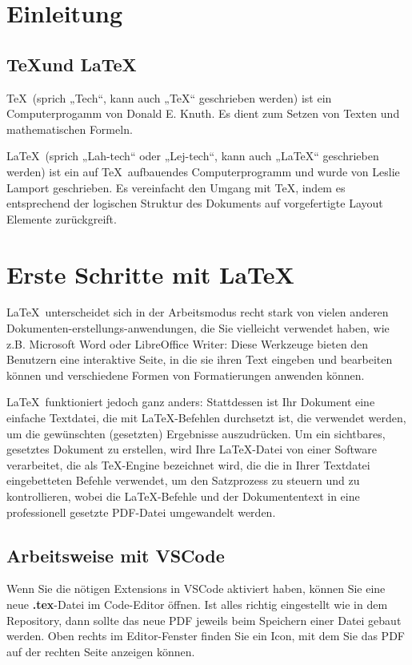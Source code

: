 \section{Einleitung}
\subsection{\TeX und \LaTeX}

\TeX\, (sprich „Tech“, kann auch „TeX“ geschrieben werden) ist ein Computerprogamm von Donald E. Knuth.
Es dient zum Setzen von Texten und mathematischen Formeln.
\vspace{2mm}


\LaTeX\, (sprich „Lah-tech“ oder „Lej-tech“, kann auch „LaTeX“ geschrieben werden) ist ein auf \TeX\, aufbauendes Computerprogramm und wurde von Leslie Lamport geschrieben. Es vereinfacht den Umgang mit  \TeX, indem es entsprechend der logischen Struktur des Dokuments auf vorgefertigte Layout Elemente zurückgreift.

\newpage
\section{Erste Schritte mit \LaTeX}
\LaTeX\, unterscheidet sich in der Arbeitsmodus recht stark von vielen anderen Dokumenten-erstellungs-anwendungen, die Sie vielleicht verwendet haben, wie z.B. Microsoft Word oder LibreOffice Writer: Diese Werkzeuge bieten den Benutzern eine interaktive Seite, in die sie ihren Text eingeben und bearbeiten können und verschiedene Formen von Formatierungen anwenden können.

\LaTeX\, funktioniert jedoch ganz anders: Stattdessen ist Ihr Dokument eine einfache Textdatei, die mit \LaTeX-Befehlen durchsetzt ist, die verwendet werden, um die gewünschten (gesetzten) Ergebnisse auszudrücken. Um ein sichtbares, gesetztes Dokument zu erstellen, wird Ihre \LaTeX-Datei von einer Software verarbeitet, die als \TeX-Engine bezeichnet wird, die die in Ihrer Textdatei eingebetteten Befehle verwendet, um den Satzprozess zu steuern und zu kontrollieren, wobei die \LaTeX-Befehle und der Dokumententext in eine professionell gesetzte PDF-Datei umgewandelt werden.

\subsection{Arbeitsweise mit VSCode}
Wenn Sie die nötigen Extensions in VSCode aktiviert haben, können Sie eine neue \textbf{.tex}-Datei im Code-Editor öffnen. Ist alles richtig eingestellt wie in dem Repository, dann sollte das neue PDF jeweils beim Speichern einer Datei gebaut werden. Oben rechts im Editor-Fenster finden Sie ein Icon, mit dem Sie das PDF auf der rechten Seite anzeigen können.


